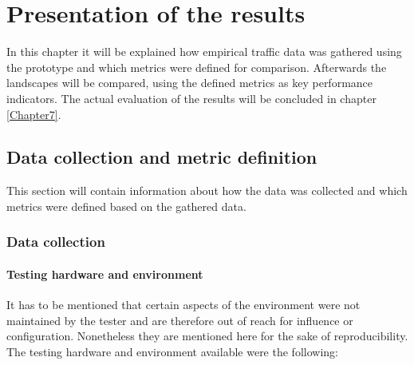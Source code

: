 \chapter{Presentation of the results} %
\label{Chapter6}


In this chapter it will be explained how empirical traffic data was gathered using the prototype and which metrics were defined for comparison.
Afterwards the landscapes will be compared, using the defined metrics as key performance indicators. The actual evaluation of the results will be concluded in chapter \ref{Chapter7}.

\section{Data collection and metric definition} 

This section will contain information about how the data was collected and which metrics were defined based on the gathered data.

\subsection{Data collection}

\subsubsection{Testing hardware and environment}

It has to be mentioned that certain aspects of the environment were not maintained by the tester and are therefore out of reach for influence or configuration. Nonetheless they are mentioned here for the sake of reproducibility.
The testing hardware and environment available were the following:

